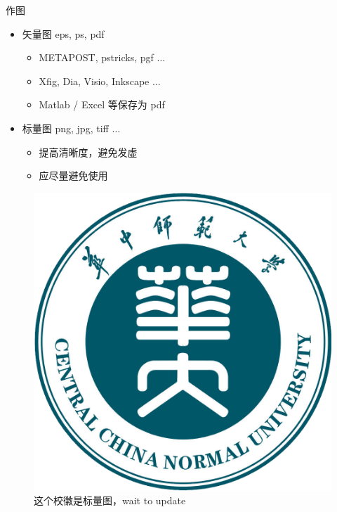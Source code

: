 \begin{frame}{作图}
	\begin{itemize}
		\item 矢量图 eps, ps, pdf
		      \begin{itemize}
			      \item METAPOST, pstricks, pgf $\ldots$
			      \item Xfig, Dia, Visio, Inkscape $\ldots$
			      \item Matlab / Excel 等保存为 pdf
		      \end{itemize}
		\item 标量图 png, jpg, tiff $\ldots$
		      \begin{itemize}
			      \item 提高清晰度，避免发虚
			      \item 应尽量避免使用
		      \end{itemize}
	\end{itemize}
	\begin{figure}[htpb]
		\centering
		\includegraphics[width=0.2\linewidth]{pic/logo/CCNU.jpg}
		\caption{这个校徽是标量图，wait to update}
	\end{figure}
\end{frame}
